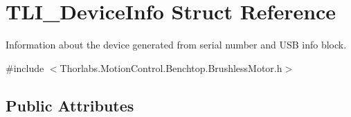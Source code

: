\hypertarget{struct_t_l_i___device_info}{}\section{T\+L\+I\+\_\+\+Device\+Info Struct Reference}
\label{struct_t_l_i___device_info}


Information about the device generated from serial number and U\+SB info block.  




{\ttfamily \#include $<$Thorlabs.\+Motion\+Control.\+Benchtop.\+Brushless\+Motor.\+h$>$}

\subsection*{Public Attributes}

